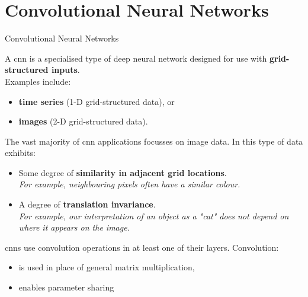 \renewcommand{\prevpart}{5 }
\renewcommand{\thispart}{6 }
\renewcommand{\nextpart}{7 }

\section{Convolutional Neural Networks}





%
%
%

\begin{frame}[t,allowframebreaks]{Convolutional Neural Networks}

    A \gls{cnn} 
    is a specialised type of deep neural network designed for use 
    with {\bf grid-structured inputs}.\\
    Examples include:
    \begin{itemize}
      \item {\bf time series} (1-D grid-structured data), or 
      \item {\bf images} (2-D grid-structured data).
    \end{itemize}

    The vast majority of \gls{cnn} applications focusses on image data.
    In this type of data exhibits:
    \begin{itemize}
        \item Some degree of {\bf similarity in adjacent grid locations}.\\
          {\it For example, neighbouring pixels often have a similar colour.}
        \item A degree of {\bf translation invariance}.\\
          {\it For example, our interpretation of an object as a "cat"
          does not depend on where it appears on the image.}
    \end{itemize}

    \framebreak

    \glspl{cnn} use  \gls{convolution}
    operations in at least one of their layers.
    Convolution:
    \begin{itemize}
     \item is used in place of general matrix multiplication,
     \item enables parameter sharing 
    \end{itemize}

\end{frame}


